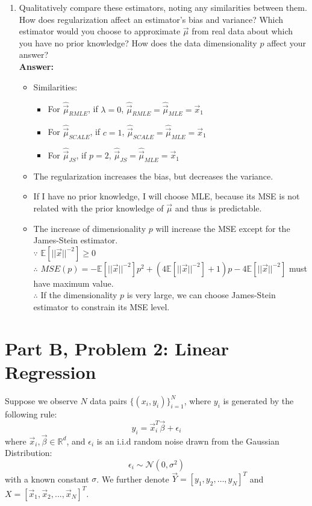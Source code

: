 \documentclass{article}
\begin{document}
\begin{enumerate}
\begin{itemize}
	\end{itemize}

	\item Qualitatively compare these estimators, noting any similarities between them. How does regularization affect an estimator's bias and variance? Which estimator would you choose to approximate $\vec{\mu}$ from real data about which you have no prior knowledge? How does the data dimensionality $p$ affect your answer?
	\\\textbf{Answer:}\\
	\begin{itemize}
		\item Similarities:
		\begin{itemize}
			\item For $\hat{\vec{\mu}}_{RMLE}$, if $\lambda=0$, $\hat{\vec{\mu}}_{RMLE}=\hat{\vec{\mu}}_{MLE}=\vec{x}_1$
			\item For $\hat{\vec{\mu}}_{SCALE}$, if $c=1$, $\hat{\vec{\mu}}_{SCALE}=\hat{\vec{\mu}}_{MLE}=\vec{x}_1$
			\item For $\hat{\vec{\mu}}_{JS}$, if $p=2$, $\hat{\vec{\mu}}_{JS}=\hat{\vec{\mu}}_{MLE}=\vec{x}_1$
		\end{itemize}
		\item The regularization increases the bias, but decreases the variance.
		\item If I have no prior knowledge, I will choose MLE, because its MSE is not related with the prior knowledge of $\vec{\mu}$ and thus is predictable.
		\item The increase of dimensionality $p$ will increase the MSE except for the James-Stein estimator.\\
		$\because$ $\mathbb{E}[||\vec{x}||^{-2}] \geq 0$\\
		$\therefore$ $MSE(p)=-\mathbb{E}[||\vec{x}||^{-2}]p^2+(4\mathbb{E}[||\vec{x}||^{-2}]+1)p-4\mathbb{E}[||\vec{x}||^{-2}]$ must have maximum value.\\
		$\therefore$ If the dimensionality $p$ is very large, we can choose James-Stein estimator to constrain its MSE level.
	\end{itemize}
	
\end{enumerate}

\newpage

\section*{Part B, Problem 2: Linear Regression}
Suppose we observe $N$ data pairs $\{(x_i,y_i)\}_{i=1}^N$, where $y_i$ is generated by the following rule:
$$y_i=\vec{x}_i^T \vec{\beta} + \epsilon_i$$
where $\vec{x}_i,\vec{\beta}\in \mathbb{R}^d$, and $\epsilon_i$ is an i.i.d random noise drawn from the Gaussian Distribution:
$$\epsilon_i \sim \mathcal{N}(0,\sigma^2)$$
with a known constant $\sigma$. We further denote $\vec{Y}=[y_1,y_2,\dots,y_N]^T$ and $X=[\vec{x}_1,\vec{x}_2,...,\vec{x}_N]^T$.
\end{document}
